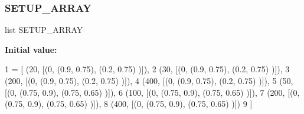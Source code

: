 \subsubsection{\texorpdfstring{S\+E\+T\+U\+P\+\_\+\+A\+R\+R\+AY}{SETUP\_ARRAY}}
{\footnotesize\ttfamily list S\+E\+T\+U\+P\+\_\+\+A\+R\+R\+AY}

{\bfseries Initial value\+:}
\begin{DoxyCode}
1 =  [ (20, [(0, (0.9, 0.75), (0.2, 0.75) )]),
2                 (30, [(0, (0.9, 0.75), (0.2, 0.75) )]),
3                 (200, [(0, (0.9, 0.75), (0.2, 0.75) )]),
4                 (400, [(0, (0.9, 0.75), (0.2, 0.75) )]),
5                 (50, [(0, (0.75, 0.9), (0.75, 0.65) )]),
6                 (100, [(0, (0.75, 0.9), (0.75, 0.65) )]),
7                 (200, [(0, (0.75, 0.9), (0.75, 0.65) )]),
8                 (400, [(0, (0.75, 0.9), (0.75, 0.65) )])
9                 ]
\end{DoxyCode}
